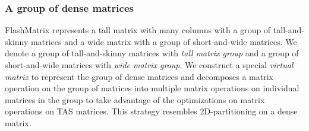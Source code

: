


\subsubsection{A group of dense matrices} \label{sec:mat_group}
FlashMatrix represents a tall matrix with many columns with a group of
tall-and-skinny matrices and a wide matrix with a group of short-and-wide
matrices. We denote a group of tall-and-skinny matrices with \textit{tall
matrix group} and a group of short-and-wide matrices with \textit{wide matrix
group}. We construct a special \textit{virtual matrix} to represent
the group of dense matrices and decomposes a matrix operation on the group of
matrices into multiple matrix operations on individual matrices in the group to
take advantage of the optimizations on matrix operations on TAS matrices.
This strategy resembles 2D-partitioning on a dense matrix.


